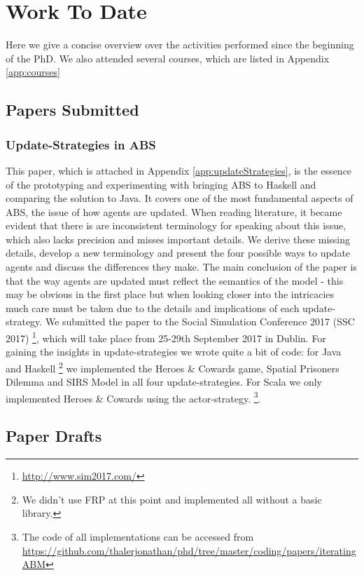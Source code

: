 \chapter{Work To Date}
\label{chap:work}

Here we give a concise overview over the activities performed since the beginning of the PhD. We also attended several courses, which are listed in Appendix \ref{app:courses}

\section{Papers Submitted}
\subsection{Update-Strategies in ABS}
This paper, which is attached in Appendix \ref{app:updateStrategies}, is the essence of the prototyping and experimenting with bringing ABS to Haskell and comparing the solution to Java. It covers one of the most fundamental aspects of ABS, the issue of how agents are updated. When reading literature, it became evident that there is are inconsistent terminology for speaking about this issue, which also lacks precision and misses important details. We derive these missing details, develop a new terminology and present the four possible ways to update agents and discuss the differences they make. The main conclusion of the paper is that the way agents are updated must reflect the semantics of the model - this may be obvious in the first place but when looking closer into the intricacies  much care must be taken due to the details and implications of each update-strategy.
We submitted the paper to the Social Simulation Conference 2017 (SSC 2017) \footnote{\url{http://www.sim2017.com/}}, which will take place from 25-29th September 2017 in Dublin.
For gaining the insights in update-strategies we wrote quite a bit of code: for Java and Haskell \footnote{We didn't use FRP at this point and implemented all without a basic library.} we implemented the Heroes \& Cowards game, Spatial Prisoners Dilemma and SIRS Model in all four update-strategies. For Scala we only implemented Heroes \& Cowards using the actor-strategy.
\footnote{The code of all implementations can be accessed from \url{https://github.com/thalerjonathan/phd/tree/master/coding/papers/iteratingABM}}. 

\section{Paper Drafts}
